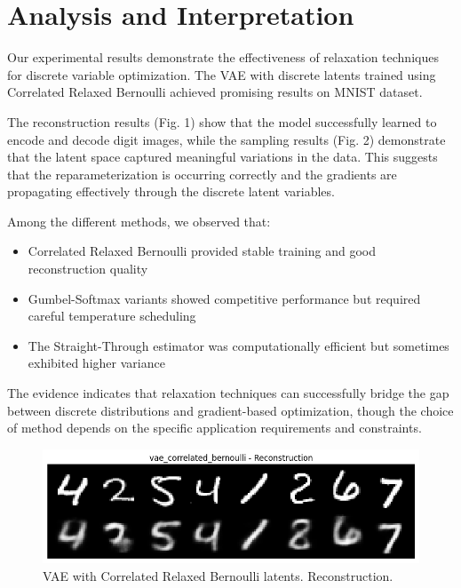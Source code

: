 \documentclass[peerreview]{IEEEtran}
\begin{document}
\section{Analysis and Interpretation}
Our experimental results demonstrate the effectiveness of relaxation techniques for discrete variable optimization. The VAE with discrete latents trained using Correlated Relaxed Bernoulli achieved promising results on MNIST dataset.

The reconstruction results (Fig. 1) show that the model successfully learned to encode and decode digit images, while the sampling results (Fig. 2) demonstrate that the latent space captured meaningful variations in the data. This suggests that the reparameterization is occurring correctly and the gradients are propagating effectively through the discrete latent variables.

Among the different methods, we observed that:
\begin{itemize}
\item Correlated Relaxed Bernoulli provided stable training and good reconstruction quality
\item Gumbel-Softmax variants showed competitive performance but required careful temperature scheduling
\item The Straight-Through estimator was computationally efficient but sometimes exhibited higher variance
\end{itemize}

The evidence indicates that relaxation techniques can successfully bridge the gap between discrete distributions and gradient-based optimization, though the choice of method depends on the specific application requirements and constraints.

\begin{figure}[!h]
\centering
\includegraphics[width=0.8\columnwidth]{vae_correlated_bernoulli_reconstruction.png}
\caption{VAE with Correlated Relaxed Bernoulli latents. Reconstruction.}
\label{fig_reconstruction}
\end{figure}
\end{document}
